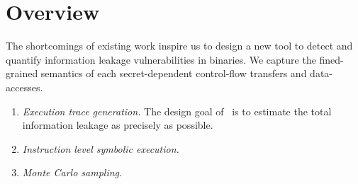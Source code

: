\section{Overview}
The shortcomings of existing work inspire us to design a new tool to detect
and quantify information leakage vulnerabilities in binaries. We capture the 
fined-grained semantics of each secret-dependent control-flow transfers 
and data-accesses. 

\begin{enumerate}
    \item \textit{Execution trace generation.} The design goal of \tana\ is to
    estimate the total information leakage as precisely as possible. 
    \item \textit{Instruction level symbolic execution.}
    \item \textit{Monte Carlo sampling.}
\end{enumerate}